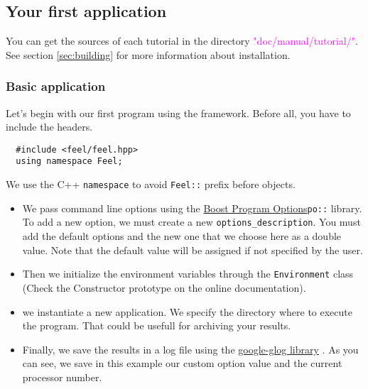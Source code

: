 
\subsection{Your first application}
\label{sec:firstapp}

You can get the sources of each tutorial in the directory
\textcolor{magenta}{"doc/manual/tutorial/"}.
See section \ref{sec:building} for more information about \feel installation.

\subsubsection{Basic application}
%
Let's begin with our first program using the \feel framework.
Before all, you have to include the \feel headers.
%
\vspace{2mm}
\begin{lstlisting}
  #include <feel/feel.hpp>
  using namespace Feel;
\end{lstlisting}
\vspace{2mm}
%
We use the C++ \lstinline!namespace! to avoid \lstinline!Feel::! prefix before
\feel objects.
%
\vspace{2mm}

\vspace{2mm}
%
\begin{itemize}
\item
We pass command line options using the
\href{http://www.boost.org/doc/libs/1_53_0/doc/html/program_options.html}
{Boost Program Options}\footnotemark[1] \lstinline!po::! library.
%
%
To add a new \feel option, we must create a new
\feel \lstinline!options_description!. You must add the default \feel options
and the new one that we choose here as a double value. Note that the default
value will be assigned if not specified by the user.

\item
Then we initialize the environment variables through the \feel
\lstinline!Environment! class (Check the Constructor prototype on the online documentation).

\item
we instantiate a new application. We specify the directory where to execute the
program. That could be usefull for archiving your results.

\item
Finally, we save the results in a log file using the
\href{http://code.google.com/p/google-glog/}{google-glog library}
\footnotemark[2].
%
%
As you can see, we save in this example our custom option value and the
current processor number.

\end{itemize}


